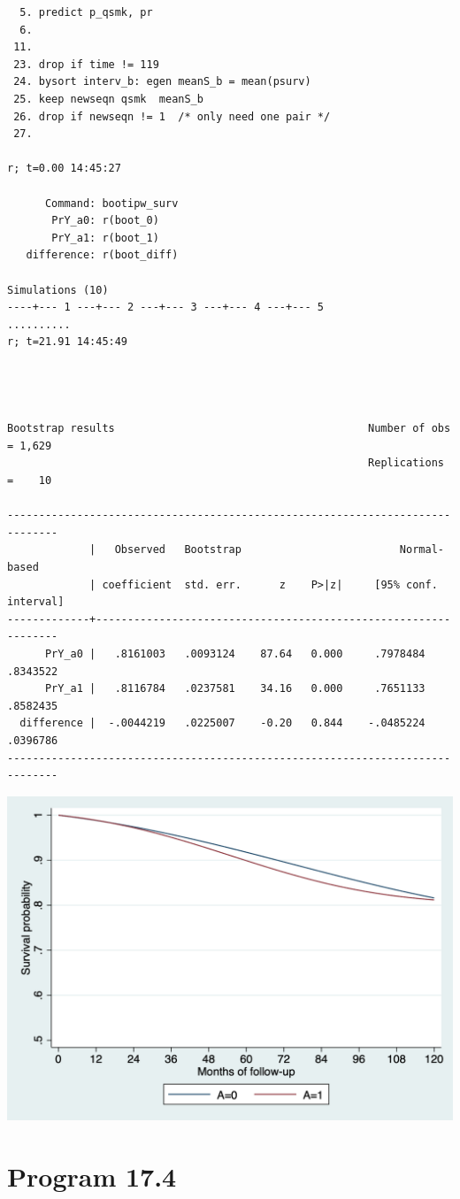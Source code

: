 \documentclass[
  10pt,
]{book}
\begin{document}
\begin{verbatim}
  5. predict p_qsmk, pr
  6. 
 11.         
 23. drop if time != 119
 24. bysort interv_b: egen meanS_b = mean(psurv)
 25. keep newseqn qsmk  meanS_b 
 26. drop if newseqn != 1  /* only need one pair */
 27.         

r; t=0.00 14:45:27

      Command: bootipw_surv
       PrY_a0: r(boot_0)
       PrY_a1: r(boot_1)
   difference: r(boot_diff)

Simulations (10)
----+--- 1 ---+--- 2 ---+--- 3 ---+--- 4 ---+--- 5 
..........
r; t=21.91 14:45:49




Bootstrap results                                        Number of obs = 1,629
                                                         Replications  =    10

------------------------------------------------------------------------------
             |   Observed   Bootstrap                         Normal-based
             | coefficient  std. err.      z    P>|z|     [95% conf. interval]
-------------+----------------------------------------------------------------
      PrY_a0 |   .8161003   .0093124    87.64   0.000     .7978484    .8343522
      PrY_a1 |   .8116784   .0237581    34.16   0.000     .7651133    .8582435
  difference |  -.0044219   .0225007    -0.20   0.844    -.0485224    .0396786
------------------------------------------------------------------------------
\end{verbatim}

\begin{center}\includegraphics[width=0.85\linewidth]{./figs/stata-fig-17-3} \end{center}

\hypertarget{program-17.4-1}{%
\section{Program 17.4}\label{program-17.4-1}}
\end{document}
